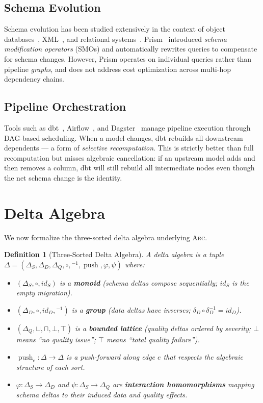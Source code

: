 \documentclass[sigplan,screen,nonacm]{acmart}
\newcommand{\arc}{\textsc{Arc}\xspace}
\newcommand{\DeltaS}{\Delta_{\!S}}
\newcommand{\DeltaD}{\Delta_{\!D}}
\newcommand{\DeltaQ}{\Delta_{\!Q}}
\newcommand{\compose}{\mathbin{\circ}}
\newcommand{\push}{\operatorname{push}}
\newtheorem{definition}[theorem]{Definition}
\begin{document}
\subsection{Schema Evolution}

Schema evolution has been studied extensively in the context of object
databases~\cite{banerjee1987semantics}, XML~\cite{guerrini2007xml}, and
relational systems~\cite{curino2008moon}.  Prism~\cite{curino2008prism}
introduced \emph{schema modification operators} (SMOs) and
automatically rewrites queries to compensate for schema changes.
However, Prism operates on individual queries rather than pipeline
\emph{graphs}, and does not address cost optimization across multi-hop
dependency chains.

\subsection{Pipeline Orchestration}

Tools such as dbt~\cite{dbt2023}, Airflow~\cite{airflow2023}, and
Dagster~\cite{dagster2023} manage pipeline execution through DAG-based
scheduling.  When a model changes, dbt rebuilds all downstream dependents
--- a form of \emph{selective recomputation}.  This is strictly better than
full recomputation but misses algebraic cancellation: if an upstream model
adds and then removes a column, dbt will still rebuild all intermediate
nodes even though the net schema change is the identity.

\section{Delta Algebra}\label{sec:theory}

We now formalize the three-sorted delta algebra underlying \arc.

\begin{definition}[Three-Sorted Delta Algebra]
A \emph{delta algebra} is a tuple
$\Delta = (\DeltaS, \DeltaD, \DeltaQ, \compose, {}^{-1}, \push,
\varphi, \psi)$ where:
\begin{itemize}
\item $(\DeltaS, \compose, \mathit{id}_S)$ is a \textbf{monoid} (schema
  deltas compose sequentially; $\mathit{id}_S$ is the empty migration).
\item $(\DeltaD, \compose, \mathit{id}_D, {}^{-1})$ is a \textbf{group}
  (data deltas have inverses; $\delta_D \compose \delta_D^{-1} =
  \mathit{id}_D$).
\item $(\DeltaQ, \sqcup, \sqcap, \bot, \top)$ is a \textbf{bounded lattice}
  (quality deltas ordered by severity; $\bot$ means ``no quality issue'';
  $\top$ means ``total quality failure'').
\item $\push_e\colon \Delta \to \Delta$ is a push-forward along edge $e$
  that respects the algebraic structure of each sort.
\item $\varphi\colon \DeltaS \to \DeltaD$ and $\psi\colon \DeltaS \to
  \DeltaQ$ are \textbf{interaction homomorphisms} mapping schema deltas to
  their induced data and quality effects.
\end{itemize}
\end{definition}
\end{document}
